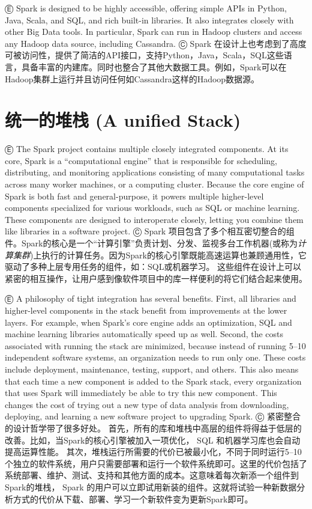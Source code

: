 Ⓔ Spark is designed to be highly accessible, offering simple APIs in
Python, Java, Scala, and SQL, and rich built-in libraries. It also
integrates closely with other Big Data tools. In particular, Spark can
run in Hadoop clusters and access any Hadoop data source, including
Cassandra. Ⓒ Spark
在设计上也考虑到了高度可被访问性，提供了简洁的API接口，支持Python，Java，Scala，SQL这些语言，具备丰富的内建库。同时也整合了其他大数据工具。例如，Spark可以在Hadoop集群上运行并且访问任何如Cassandra这样的Hadoop数据源。

\section{统一的堆栈 (A unified
Stack)}\label{ux7edfux4e00ux7684ux5806ux6808-a-unified-stack}

Ⓔ The Spark project contains multiple closely integrated components. At
its core, Spark is a ``computational engine'' that is responsible for
scheduling, distributing, and monitoring applications consisting of many
computational tasks across many worker machines, or a computing cluster.
Because the core engine of Spark is both fast and general-purpose, it
powers multiple higher-level components specialized for various
workloads, such as SQL or machine learning. These components are
designed to interoperate closely, letting you combine them like
libraries in a software project. Ⓒ Spark
项目包含了多个相互密切整合的组件。Spark的核心是一个``计算引擎''负责计划、分发、监视多台工作机器(或称为\emph{计算集群})上执行的计算任务。因为Spark的核心引擎既能高速运算也兼顾通用性，它驱动了多种上层专用任务的组件，如：SQL或机器学习。
这些组件在设计上可以紧密的相互操作，让用户感到像软件项目中的库一样便利的将它们结合起来使用。

Ⓔ A philosophy of tight integration has several benefits. First, all
libraries and higher-level components in the stack benefit from
improvements at the lower layers. For example, when Spark's core engine
adds an optimization, SQL and machine learning libraries automatically
speed up as well. Second, the costs associated with running the stack
are minimized, because instead of running 5--10 independent software
systems, an organization needs to run only one. These costs include
deployment, maintenance, testing, support, and others. This also means
that each time a new component is added to the Spark stack, every
organization that uses Spark will immediately be able to try this new
component. This changes the cost of trying out a new type of data
analysis from downloading, deploying, and learning a new software
project to upgrading Spark. Ⓒ 紧密整合的设计哲学带了很多好处。
首先，所有的库和堆栈中高层的组件将得益于低层的改善。比如，当Spark的核心引擎被加入一项优化，
SQL 和机器学习库也会自动提高运算性能。
其次，堆栈运行所需要的代价已被最小化，不同于同时运行5--10个独立的软件系统，用户只需要部署和运行一个软件系统即可。这里的代价包括了系统部署、维护、测试、支持和其他方面的成本。这意味着每次新添一个组件到Spark的堆栈，
Spark
的用户可以立即试用新装的组件。这就将试验一种新数据分析方式的代价从下载、部署、学习一个新软件变为更新Spark即可。

